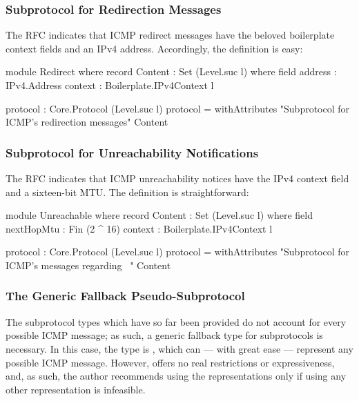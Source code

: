 \documentclass{report}
\begin{document}
\subsubsection{Subprotocol for Redirection Messages}
The RFC indicates that ICMP redirect messages have the beloved boilerplate context fields and an IPv4 address.  Accordingly, the definition is easy:

\begin{code}
    module Redirect where
      record Content : Set (Level.suc l) where
        field
          address : IPv4.Address
          context : Boilerplate.IPv4Context l

      protocol : Core.Protocol (Level.suc l)
      protocol = withAttributes "Subprotocol for ICMP's redirection messages"
                                Content
\end{code}

\subsubsection{Subprotocol for Unreachability Notifications}
The RFC indicates that ICMP unreachability notices have the IPv4 context field and a sixteen-bit MTU.  The definition is straightforward:

\begin{code}
    module Unreachable where
      record Content : Set (Level.suc l) where
        field
          nextHopMtu : Fin (2 ^ 16)
          context : Boilerplate.IPv4Context l

      protocol : Core.Protocol (Level.suc l)
      protocol = withAttributes "Subprotocol for ICMP's messages regarding \
                                \unreachability"
                                Content
\end{code}

\subsubsection{The Generic Fallback Pseudo-Subprotocol}
The subprotocol types which have so far been provided do not account for every possible ICMP message; as such, a generic fallback type for subprotocols is necessary.  In this case, the type is , which can --- with great ease --- represent any possible ICMP message.  However,  offers no real restrictions or expressiveness, and, as such, the author recommends using the  representations only if using any other representation is infeasible.
\end{document}
